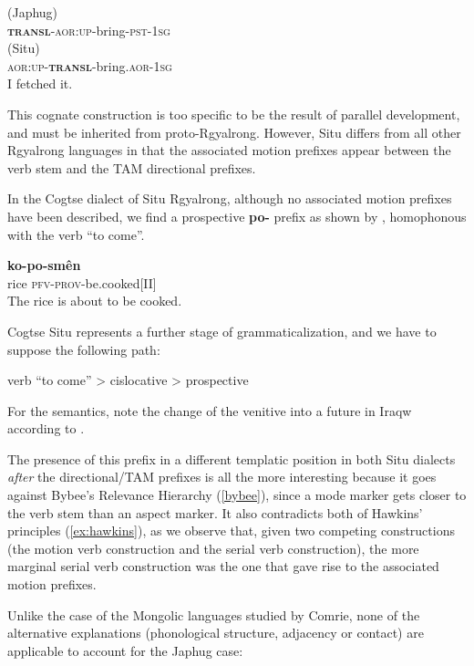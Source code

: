 \documentclass[oldfontcommands,twoside,a4paper,12pt]{article}
\newcommand{\ipa}[1]{{\phon\textbf{#1}}}
\newcommand{\aor}{\textsc{aor}}
\newcommand{\pst}{\textsc{pst}}
\newcommand{\sg}{\textsc{sg}}
\begin{document}
\begin{exe}
 \ex  
 \gll  \ipa{\textbf{ɕ}-tɤ-ru-t-a}  (Japhug) \\
 \textbf{\textsc{transl}}-\aor{}:\textsc{up}-bring-\pst{}-1\sg{} \\
\ex  
 \gll  \ipa{rə-\textbf{ɕɐ}-rô-ŋ}  (Situ) \\
 \aor{}:\textsc{up}-\textbf{\textsc{transl}}-bring.\textsc{aor}-1\sg{} \\
\glt I fetched it.
\end{exe}
This cognate construction is too specific  to be the result of parallel development, and must be inherited from proto-Rgyalrong. However, Situ differs from all other Rgyalrong languages in that the associated motion prefixes appear between the verb stem and the TAM directional prefixes.

In the Cogtse dialect of Situ Rgyalrong, although    no associated motion prefixes have been described, we find a prospective \ipa{po-} prefix as shown by \citet[268]{youjing03zhuokeji}, homophonous with the verb ``to come''. 
\begin{exe}
\ex  
 \gll \ipa{khrī}   	\ipa{ko-po-smên}    \\
rice \textsc{pfv}-\textsc{prov}-be.cooked[II] \\
 The rice is about to be cooked.
\end{exe}

  Cogtse Situ represents a further stage of grammaticalization, and we have to suppose the following path:
\begin{exe}
\ex  
 \glt verb ``to come'' > cislocative > prospective
\end{exe}
For the semantics, note the change of the venitive into a future in Iraqw according to \citet[308-9]{heine-kuteva02}.

The presence of this prefix in a different templatic position in both Situ dialects \textit{after} the directional/TAM prefixes is all the more interesting because it goes against Bybee's Relevance Hierarchy (\ref{bybee}), since a mode marker gets closer to the verb stem than an aspect marker. It also contradicts both of Hawkins' principles (\ref{ex:hawkins}), as we observe that, given two competing constructions (the motion verb construction and the serial verb construction), the more   marginal serial verb construction was the one that gave rise to the associated motion prefixes.


Unlike the case of the Mongolic languages studied by Comrie, none of the alternative explanations (phonological structure, adjacency or contact) are applicable to account for the Japhug case:
\end{document}
